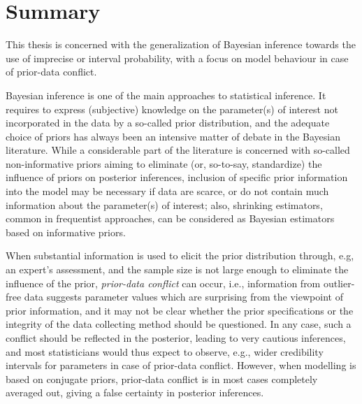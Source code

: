
\chapter*{Summary}

This thesis is concerned with the generalization of Bayesian inference towards the use of imprecise or interval probability,
with a focus on model behaviour in case of prior-data conflict.

Bayesian inference is one of the main approaches to statistical inference.
It requires to express (subjective) knowledge on the parameter(s) of interest not incorporated in the data by a so-called prior distribution,
and the adequate choice of priors has always been an intensive matter of debate in the Bayesian literature.
While a considerable part of the literature is concerned with so-called non-informative priors
aiming to eliminate (or, so-to-say, standardize) the influence of priors on posterior inferences,
inclusion of specific prior information into the model may be necessary if data are scarce,
or do not contain much information about the parameter(s) of interest;
also, shrinking estimators, common in frequentist approaches, can be considered as Bayesian estimators based on informative priors.

When substantial information is used to elicit the prior distribution through, e.g, an expert's assessment,
and the sample size is not large enough to eliminate the influence of the prior, \emph{prior-data conflict} can occur,
i.e., information from outlier-free data suggests parameter values which are surprising from the viewpoint of prior information,
and it may not be clear whether the prior specifications or the integrity of the data collecting method should be questioned.
In any case, such a conflict should be reflected in the posterior, leading to very cautious inferences,
and most statisticians would thus expect to observe, e.g., wider credibility intervals for parameters in case of prior-data conflict.
However, when modelling is based on conjugate priors, prior-data conflict is in most cases completely averaged out,
giving a false certainty in posterior inferences.

%
%
%

